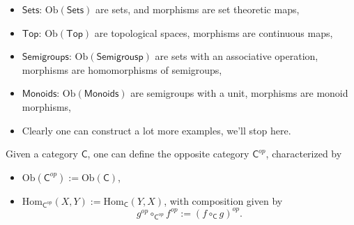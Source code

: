 \begin{ex}\leavevmode\vspace{-.2\baselineskip}
	\begin{itemize}
		\item $\mathsf{Sets}$: $\mathrm{Ob} \left(\mathsf{Sets}\right)$ are sets, and morphisms are set theoretic maps,
		\item $\mathsf{Top}$: $\mathrm{Ob} \left(\mathsf{Top}\right)$ are topological spaces, morphisms are continuous maps,
		\item $\mathsf{Semigroups}$: $\mathrm{Ob} \left(\mathsf{Semigrousp}\right)$ are sets with an associative operation, morphisms are homomorphisms of semigroups,
		\item $\mathsf{Monoids}$: $\mathrm{Ob} \left(\mathsf{Monoids}\right)$ are semigroups with a unit, morphisms are monoid morphisms,
		\item Clearly one can construct a lot more examples, we'll stop here.
	\end{itemize}
\end{ex} 

\begin{defn}
	Given a category $\mathsf{C}$, one can define the opposite category $\mathsf{C}^{op}$, characterized by
	\begin{itemize}
		\item $\mathrm{Ob}(\mathsf{C}^{op}) := \mathrm{Ob}(\mathsf{C})$,
		\item $\mathrm{Hom}_{\mathsf{C}^{op}} \left( X, Y \right) := \mathrm{Hom}_{\mathsf{C}} \left( Y, X \right)$, with composition given by
			\begin{equation}
				g^{op} \circ_{\mathsf{C}^{op}} f^{op} := \left( f \circ_{\mathsf{C}} g \right)^{op}
			.\end{equation} 
	\end{itemize} 
\end{defn}


